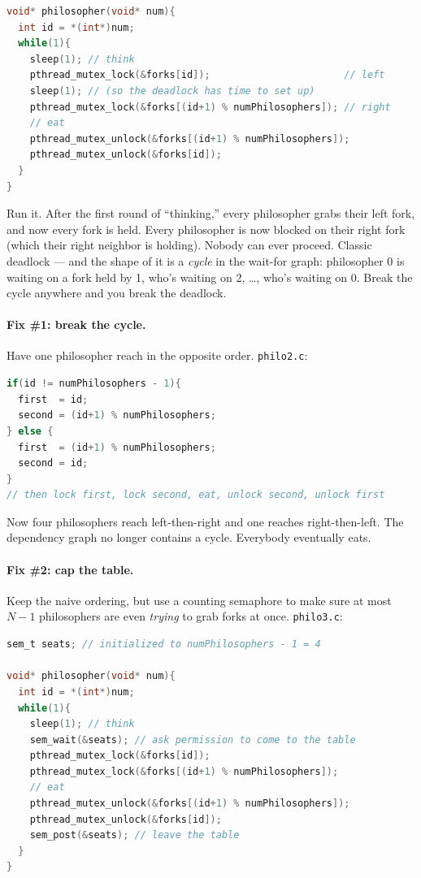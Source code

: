 \documentclass[11pt]{article}
\begin{document}
\begin{lstlisting}[language=C]
void* philosopher(void* num){
  int id = *(int*)num;
  while(1){
    sleep(1); // think
    pthread_mutex_lock(&forks[id]);                       // left
    sleep(1); // (so the deadlock has time to set up)
    pthread_mutex_lock(&forks[(id+1) % numPhilosophers]); // right
    // eat
    pthread_mutex_unlock(&forks[(id+1) % numPhilosophers]);
    pthread_mutex_unlock(&forks[id]);
  }
}
\end{lstlisting}

Run it. After the first round of ``thinking,'' every philosopher
grabs their left fork, and now every fork is held. Every philosopher
is now blocked on their right fork (which their right neighbor is
holding). Nobody can ever proceed. Classic deadlock --- and the
shape of it is a \emph{cycle} in the wait-for graph: philosopher 0
is waiting on a fork held by 1, who's waiting on 2, \dots, who's
waiting on 0. Break the cycle anywhere and you break the deadlock.

\paragraph{Fix \#1: break the cycle.} Have one philosopher reach in
the opposite order. \texttt{philo2.c}:

\begin{lstlisting}[language=C]
if(id != numPhilosophers - 1){
  first  = id;
  second = (id+1) % numPhilosophers;
} else {
  first  = (id+1) % numPhilosophers;
  second = id;
}
// then lock first, lock second, eat, unlock second, unlock first
\end{lstlisting}

Now four philosophers reach left-then-right and one reaches
right-then-left. The dependency graph no longer contains a cycle.
Everybody eventually eats.

\paragraph{Fix \#2: cap the table.} Keep the naive ordering, but use
a counting semaphore to make sure at most $N{-}1$ philosophers are
even \emph{trying} to grab forks at once. \texttt{philo3.c}:

\begin{lstlisting}[language=C]
sem_t seats; // initialized to numPhilosophers - 1 = 4

void* philosopher(void* num){
  int id = *(int*)num;
  while(1){
    sleep(1); // think
    sem_wait(&seats); // ask permission to come to the table
    pthread_mutex_lock(&forks[id]);
    pthread_mutex_lock(&forks[(id+1) % numPhilosophers]);
    // eat
    pthread_mutex_unlock(&forks[(id+1) % numPhilosophers]);
    pthread_mutex_unlock(&forks[id]);
    sem_post(&seats); // leave the table
  }
}
\end{lstlisting}
\end{document}
